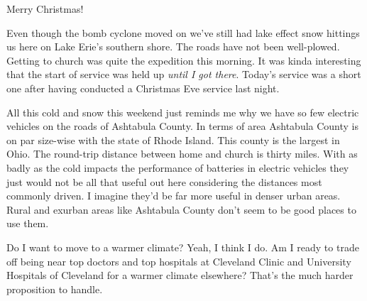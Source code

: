 Merry Christmas!

Even though the bomb cyclone moved on we've still had lake effect snow
hittings us here on Lake Erie's southern shore. The roads have not been
well-plowed. Getting to church was quite the expedition this morning. It
was kinda interesting that the start of service was held up \emph{until
I got there}. Today's service was a short one after having conducted a
Christmas Eve service last night.

All this cold and snow this weekend just reminds me why we have so few
electric vehicles on the roads of Ashtabula County. In terms of area
Ashtabula County is on par size-wise with the state of Rhode Island.
This county is the largest in Ohio. The round-trip distance between home
and church is thirty miles. With as badly as the cold impacts the
performance of batteries in electric vehicles they just would not be all
that useful out here considering the distances most commonly driven. I
imagine they'd be far more useful in denser urban areas. Rural and
exurban areas like Ashtabula County don't seem to be good places to use
them.

Do I want to move to a warmer climate? Yeah, I think I do. Am I ready to
trade off being near top doctors and top hospitals at Cleveland Clinic
and University Hospitals of Cleveland for a warmer climate elsewhere?
That's the much harder proposition to handle.
